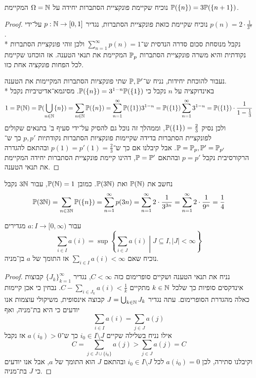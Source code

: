\Question{}
נוכיח שקיימת פונקציית הסתברות יחידה על $\Omega = \mathbb{N}$ המקיימת $\mathbb{P}(\{n\}) = 3 \mathbb{P}(\{n + 1\})$.
\begin{proof}
	נוכיח שקיימת כזאת פונקציית הסתברות, נגדיר $p : \mathbb{N} \to [0, 1]$ על־ידי $p(n) = 2 \cdot \frac{1}{3^n}$. \\*
	נקבל מנוסחת סכום סדרה הנדסית ש־$\sum_{n = 1}^{\infty} p(n) = 1$ ולכן זוהי פונקציית הסתברות נקודתית והיא משרה פונקציית הסתברות $\mathbb{P}_p$ המקיימת את תנאי הטענה.
	אז הוכחנו שקיימת לכל הפחות פונקציה אחת כזו.

	נעבור להוכחת יחידות, נניח ש־$\mathbb{P}, \mathbb{P}'$ שתי פונקציות הסתברות המקיימות את הטענה. \\*
	באינדוקציה על $n$ נקבל כי $\mathbb{P}(\{n\}) = 3^{1 - n} \mathbb{P}(\{1\})$.
	מסיגמא־אדיטיביות נקבל
	\[
		1
		= \mathbb{P}(\mathbb{N})
		= \mathbb{P}(\bigcup_{n \in \mathbb{N}} \{ n \})
		= \sum_{n \in \mathbb{N}} \mathbb{P}(\{ n \})
		= \sum_{n = 1}^{\infty} \mathbb{P}(\{1\}) 3^{1 - n}
		= \mathbb{P}(\{1\}) \sum_{n = 1}^{\infty} 3^{1 - n}
		= \mathbb{P}(\{1\}) \cdot \frac{1}{1 - \frac{1}{3}}
	\]
	ולכן נסיק $\mathbb{P}(\{1\}) = \frac{2}{3}$, וממהלך זה נוכל גם להסיק על־ידי סעיף ב' בתנאים שקולים לפונקציית הסתברות בדידה שקיימות פונקציות הסתברות נקודתיות $p, p'$ כך ש־$\mathbb{P} = \mathbb{P}_p, \mathbb{P}' = \mathbb{P}_{p'}$.
	אבל קיבלנו אם כך ש־$p(1) = p'(1) = \frac{2}{3}$ ובהתאם להגדרה הרקורסיבית נקבל $p = p'$ ובהתאם $\mathbb{P} = \mathbb{P}'$, דהינו קיימת פונקציית הסתברות יחידה המקיימת את תנאי הטענה.
\end{proof}
נחשב את $\mathbb{P}(\mathbb{N})$ ואת $\mathbb{P}(3\mathbb{N})$.
כמובן $\mathbb{P}(\mathbb{N}) = 1$, עבור $3\mathbb{N}$ נקבל
\[
	\mathbb{P}(3\mathbb{N}) 
	= \sum_{n \in 3\mathbb{N}} \mathbb{P}(\{n\}) 
	= \sum_{n = 1}^{\infty} p(3n) 
	= \sum_{n = 1}^{\infty} 2 \cdot \frac{1}{3^{3n}}
	= \sum_{n = 1}^{\infty} 2 \cdot \frac{1}{9^{n}}
	= \frac{1}{4}
\]

\Question{}
עבור $a : I \to [0, \infty)$ מגדירים %
\[
	\sum_{i \in I} a(i) = \sup \left\{ \sum_{i \in J} a(i) \middle| J \subseteq I, |J| < \infty \right\}
\]
נוכיח שאם $\sum_{i \in I} a(i) < \infty$ אז התומך של $a$ בן־מניה.
\begin{proof}
	נניח את תנאי הטענה ושקיים סופרימום כזה $C < \infty$, נגדיר ${\{J_k\}}_{k = 1}^\infty$ קבוצות אינדקסים סופיות כך שלכל $k \in \mathbb{N}$ מתקיים $C - \sum_{i \in J_k} a(i) < \frac{1}{k}$.
	נבחין כי אכן קיימות כאלה מהגדרת הסופרימום.
	עתה נגדיר $J = \bigcup_{k \in \mathbb{N}} J_k$ קבוצה אינסופית, משיקולי עוצמות אנו יודעים כי היא בת־מניה, ואף
	\[
		\sum_{i \in I} a(i) = \sum_{j \in J} a(j)
	\]
	אילו נניח בשלילה שקיים $i_0 \in I \setminus J$ כך ש־$a(i_0) > 0$ אז נקבל
	\[
		C = \sum_{j \in J \cup \{i_0\}} a(j) > \sum_{j \in J} a(j) = C
	\]
	וקיבלנו סתירה, לכן $a(i_0) = 0$ לכל $i_0 \in I \setminus J$ ובהתאם $J$ הוא התומך של $a$, אבל אנו יודעים כי $J$ בת־מניה.
\end{proof}

